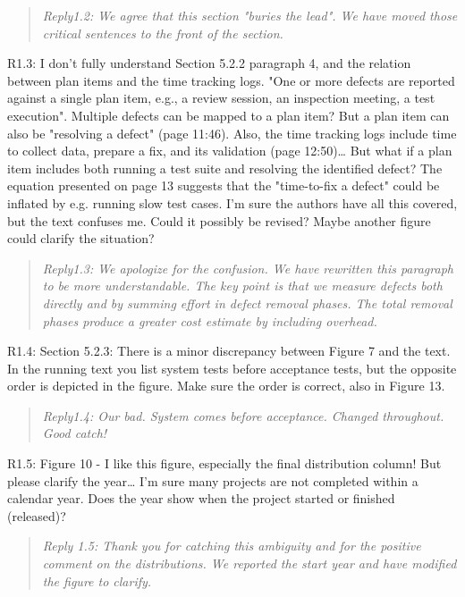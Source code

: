 \documentclass[smallcondensed]{svjour3}
\begin{document}
\begin{quote}{\em 
Reply1.2: We agree that this section "buries the lead". We have moved those critical sentences to the front of the section.
}\end{quote}

R1.3: I don't fully understand Section 5.2.2 paragraph 4, and the relation between plan items and the time tracking logs. "One or more defects are reported against a single plan item, e.g., a review session, an inspection meeting, a test execution". Multiple defects can be mapped to a plan item? But a plan item can also be "resolving a defect" (page 11:46). Also, the time tracking logs include time to collect data, prepare a fix, and its validation (page 12:50)… But what if a plan item includes both running a test suite and resolving the identified defect? The equation presented on page 13 suggests that the "time-to-fix a defect" could be inflated by e.g. running slow test cases. I'm sure the authors have all this covered, but the text confuses me. Could it possibly be revised? Maybe another figure could clarify the situation?

\begin{quote}{\em 
Reply1.3: We apologize for the confusion. We have rewritten this paragraph to be more understandable. The key point is that we measure defects both directly and by summing effort in defect removal phases. The total removal phases produce a greater cost estimate by including overhead.
}\end{quote}

R1.4: Section 5.2.3: There is a minor discrepancy between Figure 7 and the text. In the running text you list system tests before acceptance tests, but the opposite order is depicted in the figure. Make sure the order is correct, also in Figure 13.

\begin{quote}{\em 
Reply1.4: Our bad. System comes before acceptance. Changed throughout. Good catch!
}\end{quote}

R1.5: Figure 10 - I like this figure, especially the final distribution column! But please clarify the year… I'm sure many projects are not completed within a calendar year. Does the year show when the project started or finished (released)?

\begin{quote}{\em 
Reply 1.5: Thank you for catching this ambiguity and for the positive comment on the distributions. We reported the start year and have modified the figure to clarify.
}\end{quote}
\end{document}
